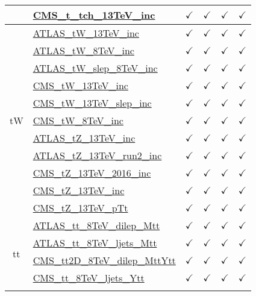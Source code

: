 \documentclass{article}
\begin{document}
\begin{longtable}{|c|l|c|c|c|c|}
 & \href{https://arxiv.org}{CMS_t_tch_13TeV_inc}  & $\checkmark$ & $\checkmark$ & $\checkmark$ & $\checkmark$
\\ \hline
\multirow{11}{*}{tW}
 & \href{https://arxiv.org}{ATLAS_tW_13TeV_inc}  & $\checkmark$ & $\checkmark$ & $\checkmark$ & $\checkmark$\\ \cline{2-6}
 & \href{https://arxiv.org}{ATLAS_tW_8TeV_inc}  & $\checkmark$ & $\checkmark$ & $\checkmark$ & $\checkmark$\\ \cline{2-6}
 & \href{https://arxiv.org}{ATLAS_tW_slep_8TeV_inc}  & $\checkmark$ & $\checkmark$ & $\checkmark$ & $\checkmark$\\ \cline{2-6}
 & \href{https://arxiv.org}{CMS_tW_13TeV_inc}  & $\checkmark$ & $\checkmark$ & $\checkmark$ & $\checkmark$\\ \cline{2-6}
 & \href{https://arxiv.org}{CMS_tW_13TeV_slep_inc}  & $\checkmark$ & $\checkmark$ & $\checkmark$ & $\checkmark$\\ \cline{2-6}
 & \href{https://arxiv.org}{CMS_tW_8TeV_inc}  & $\checkmark$ & $\checkmark$ & $\checkmark$ & $\checkmark$\\ \cline{2-6}
 & \href{https://arxiv.org}{ATLAS_tZ_13TeV_inc}  & $\checkmark$ & $\checkmark$ & $\checkmark$ & $\checkmark$\\ \cline{2-6}
 & \href{https://arxiv.org}{ATLAS_tZ_13TeV_run2_inc}  & $\checkmark$ & $\checkmark$ & $\checkmark$ & $\checkmark$\\ \cline{2-6}
 & \href{https://arxiv.org}{CMS_tZ_13TeV_2016_inc}  & $\checkmark$ & $\checkmark$ & $\checkmark$ & $\checkmark$\\ \cline{2-6}
 & \href{https://arxiv.org}{CMS_tZ_13TeV_inc}  & $\checkmark$ & $\checkmark$ & $\checkmark$ & $\checkmark$\\ \cline{2-6}
 & \href{https://arxiv.org}{CMS_tZ_13TeV_pTt}  & $\checkmark$ & $\checkmark$ & $\checkmark$ & $\checkmark$
\\ \hline
\multirow{17}{*}{tt}
 & \href{https://arxiv.org}{ATLAS_tt_8TeV_dilep_Mtt}  & $\checkmark$ & $\checkmark$ & $\checkmark$ & $\checkmark$\\ \cline{2-6}
 & \href{https://arxiv.org}{ATLAS_tt_8TeV_ljets_Mtt}  & $\checkmark$ & $\checkmark$ & $\checkmark$ & $\checkmark$\\ \cline{2-6}
 & \href{https://arxiv.org}{CMS_tt2D_8TeV_dilep_MttYtt}  & $\checkmark$ & $\checkmark$ & $\checkmark$ & $\checkmark$\\ \cline{2-6}
 & \href{https://arxiv.org}{CMS_tt_8TeV_ljets_Ytt}  & $\checkmark$ & $\checkmark$ & $\checkmark$ & $\checkmark$\\ \cline{2-6}

\end{longtable}
\end{document}
